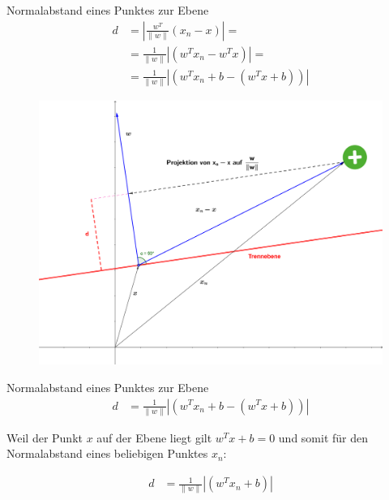 \documentclass[ngerman]{beamer}
\newcommand{\norm}[1]{\lVert#1\rVert}
\begin{document}
\begin{frame}{Normalabstand eines Punktes zur Ebene}
	\begin{equation*}
		\begin{aligned}
			d &= | \frac{w^{T}}{\lVert w \rVert} (x_{n} - x) | = \\
			&= \frac{1}{\norm{w}} | (w^{T} x_{n} - w^{T} x) | =\\
			&= \frac{1}{\norm{w}} | (w^{T} x_{n} + b - (w^{T} x + b)) |
		\end{aligned}
	\end{equation*}

	\begin{center}
		\begin{figure}
			\includegraphics[width=\textwidth,height=0.5\textheight,keepaspectratio]{assets/projection.png}
		\end{figure}
	\end{center}

\end{frame}


\begin{frame}{Normalabstand eines Punktes zur Ebene}
	\begin{equation*}
		\begin{aligned}
			d &= \frac{1}{\norm{w}} | (w^{T} x_{n} + b - (w^{T} x + b)) |
		\end{aligned}
	\end{equation*}

	Weil der Punkt $x$ auf der Ebene liegt gilt $w^{T} x + b = 0$ und somit für den Normalabstand eines beliebigen Punktes $x_{n}$:
	
	\begin{equation*}
		\begin{aligned}
			d &= \frac{1}{\norm{w}} | (w^{T} x_{n} + b) |
		\end{aligned}
	\end{equation*}
\end{frame}
\end{document}
